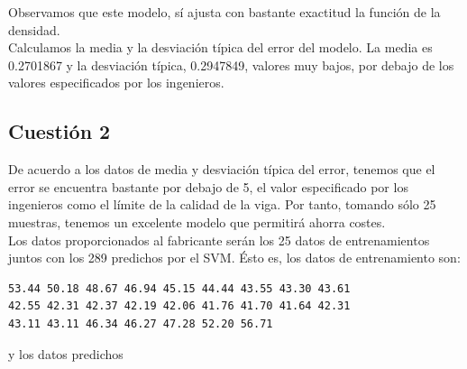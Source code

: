 \documentclass[12pt,a4paper,twoside,openright,titlepage,final]{article}
\begin{document}
Observamos que este modelo, sí ajusta con bastante exactitud la función de la densidad.\\

Calculamos la media y la desviación típica del error del modelo. La media es 0.2701867 y la desviación típica, 0.2947849, valores muy bajos, por debajo de los valores especificados por los ingenieros.

\subsection{Cuestión 2}

De acuerdo a los datos de media y desviación típica del error, tenemos que el error se encuentra bastante por debajo de 5, el valor especificado por los ingenieros como el límite de la calidad de la viga. Por tanto, tomando sólo 25 muestras, tenemos un excelente modelo que permitirá ahorra costes.\\

Los datos proporcionados al fabricante serán los 25 datos de entrenamientos juntos con los 289 predichos por el SVM. Ésto es, los datos de entrenamiento son:

\begin{verbatim}
53.44 50.18 48.67 46.94 45.15 44.44 43.55 43.30 43.61 
42.55 42.31 42.37 42.19 42.06 41.76 41.70 41.64 42.31 
43.11 43.11 46.34 46.27 47.28 52.20 56.71
\end{verbatim}

y los datos predichos 
\end{document}
